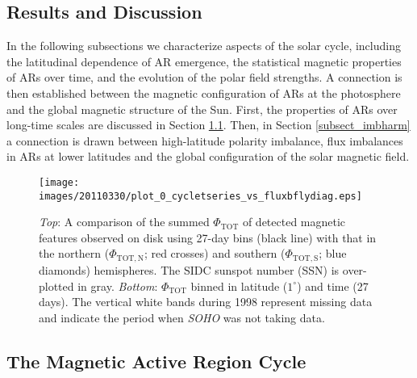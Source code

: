 \documentclass[namedreferences]{solarphysics}
\begin{document}
\begin{article}
\section{Results and Discussion}\label{results}


In the following subsections we characterize aspects of the solar cycle, including the latitudinal dependence of AR emergence, the statistical magnetic properties of ARs over time, and the evolution of the polar field strengths. A connection is then established between the magnetic configuration of ARs at the photosphere and the global magnetic structure of the Sun. First, the properties of ARs over long-time scales are discussed in Section \ref{subsect_arcycle}. Then, in Section \ref{subsect_imbharm} a connection is drawn between high-latitude polarity imbalance, flux imbalances in ARs at lower latitudes and the global configuration of the solar magnetic field.




\begin{figure*}[!t]
 
\texttt{[image: images/20110330/plot\_0\_cycletseries\_vs\_fluxbflydiag.eps]}
\caption{\emph{Top}: A comparison of the summed $\Phi_{\mathrm{TOT}}$ of detected magnetic features observed on disk using 27-day bins (black line) with that in the northern ($\Phi_{\mathrm{TOT,N}}$; red crosses) and southern ($\Phi_{\mathrm{TOT,S}}$; blue diamonds) hemispheres. The SIDC sunspot number (SSN) is over-plotted in gray. \emph{Bottom}: $\Phi_{\mathrm{TOT}}$ binned in latitude ($1^{\circ}$) and time (27\,days). The vertical white bands during 1998 represent missing data and indicate the period when \emph{SOHO} was not taking data.}\label{plot_0_cycletseries_vs_fluxbflydiag}
\end{figure*}

\subsection{The Magnetic Active Region Cycle}\label{subsect_arcycle}


\end{article}
\end{document}
